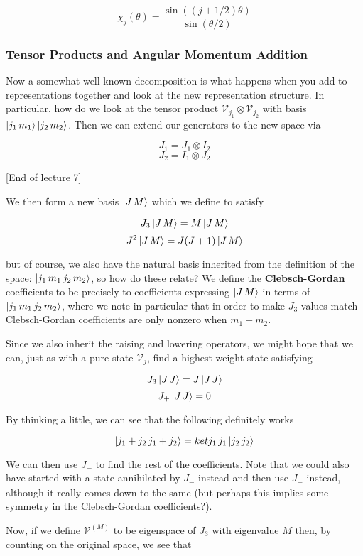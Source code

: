 \documentclass{article}
\theoremstyle{definition}
\begin{document}
$$ \chi_j(\theta) = \frac{\sin((j + 1/2) \theta)}{\sin(\theta / 2)} $$

\subsubsection{Tensor Products and Angular Momentum Addition}

Now a somewhat well known decomposition is what happens when you add to
representations together and look at the new representation structure. In
particular, how do we look at the tensor product $\mathcal{V}_{j_1} \otimes
\mathcal{V}_{j_2}$ with basis $\ket{j_1 \, m_1} \ket{j_2 \, m_2}$. Then we can
extend our generators to the new space via 

$$ J_1 = J_1 \otimes I_2 $$
$$ J_2 = I_1 \otimes J_2 $$

[End of lecture 7]

We then form a new basis $\ket{J\, M}$ which we define to satisfy

$$ J_3 \ket{J \, M} = M \ket{J \, M} $$
$$ J^2 \ket{J \, M} = J(J + 1) \ket{J \, M} $$

but of course, we also have the natural basis inherited from the definition of
the space: $\ket{j_1 \, m_1 \, j_2 \, m_2}$, so how do these relate? We define
the \textbf{Clebsch-Gordan} coefficients to be precisely to coefficients
expressing $\ket{J\, M}$ in terms of $\ket{j_1 \, m_1 \, j_2 \, m_2}$, where we
note in particular that in order to make $J_3$ values match Clebsch-Gordan
coefficients are only nonzero when $m_1 + m_2$.

Since we also inherit the raising and lowering operators, we might hope that we
can, just as with a pure state $\mathcal{V}_j$, find a highest weight state
satisfying 

$$ J_3 \ket{J\, J} = J \ket{J \, J}$$
$$ J_+ \ket{J \, J} = 0$$

By thinking a little, we can see that the following definitely works

$$ \ket{j_1 + j_2 \, j_1 + j_2} = ket{j_1\, j_1} \ket{j_2\, j_2} $$

We can then use $J_-$ to find the rest of the coefficients. Note that we could
also have started with a state annihilated by $J_-$ instead and then use $J_+$
instead, although it really comes down to the same (but perhaps this implies
some symmetry in the Clebsch-Gordan coefficients?). 

Now, if we define $\mathcal{V}^{(M)}$ to be eigenspace of $J_3$ with eigenvalue
$M$ then, by counting on the original space, we see that
\end{document}

